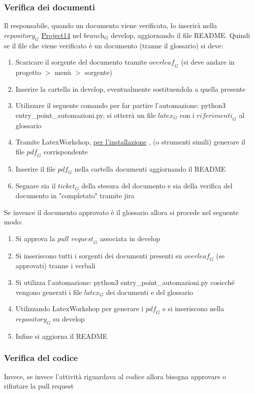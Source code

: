 \subsubsection{Verifica dei documenti}
Il responsabile, quando un documento viene verificato, lo inserirà nella $\textit{repository}_G$ \href{https://github.com/RAMtastic6/Project14}{Project14} nel $\textit{branch}_G$ develop, aggiornando il file README.
Quindi se il file che viene verificato è un documento (tranne il glossario) si deve:
\begin{enumerate}
    \item Scaricare il sorgente del documento tramite $\textit{overleaf}_G$ (si deve andare in progetto $>$ menù $>$ sorgente)
    \item Inserire la cartella in develop, eventualmente sostituendola a quella presente
    \item Utilizzare il seguente comando per far partire l'automazione: python3 entry\_point\_automazioni.py, si otterrà un file $\textit{latex}_G$ con i $\textit{riferimenti}_G$ al glossario
    \item Tramite LatexWorkshop, \href{https://github.com/James-Yu/LaTeX-Workshop/wiki/Install}{per l'installazione} , (o strumenti simili) generare il file $\textit{pdf}_G$ corrispondente
    \item Inserire il file $\textit{pdf}_G$ nella cartella documenti aggiornando il README
    \item Segnare sia il $\textit{ticket}_G$ della stesura del documento e sia della verifica del documento in "completato" tramite jira
\end{enumerate}
Se invence il documento approvato è il glossario allora si procede nel seguente modo:
\begin{enumerate}
    \item Si approva la $\textit{pull request}_G$ associata in develop
    \item Si inseriscono tutti i sorgenti dei documenti presenti su $\textit{overleaf}_G$ (se approvati) tranne i verbali
    \item Si utilizza l'automazione: python3 entry\_point\_automazioni.py
    cosicché vengono generati i file $\textit{latex}_G$ dei documenti e del glossario
    \item Utilizzando LatexWorkshop per generare i $\textit{pdf}_G$ e si inseriscono nella $\textit{repository}_G$ su develop
    \item Infine si aggiorna il README
\end{enumerate}
\subsubsection{Verifica del codice}
Invece, se invece l'attività riguardava al codice allora bisogna approvare o rifiutare la pull request
